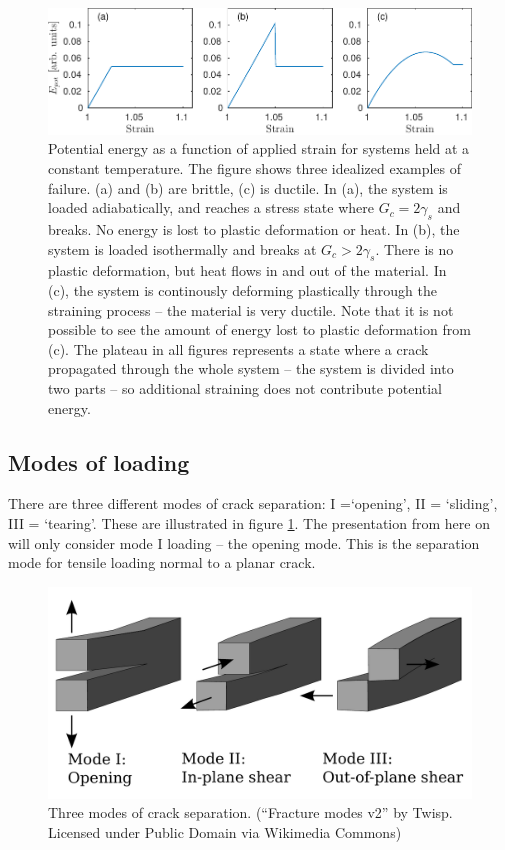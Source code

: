 \begin{figure}
\centering
\includegraphics[width=\textwidth]{../figures/thesis/idealized_fracture_e_pot.pdf}
\caption{Potential energy as a function of applied strain for systems held at a constant temperature. The figure shows three idealized examples of failure. (a) and (b) are brittle, (c) is ductile. In (a), the system is loaded adiabatically, and reaches a stress state where $G_c = 2\gamma_s$ and breaks. No energy is lost to plastic deformation or heat. In (b), the system is loaded isothermally and breaks at $G_c > 2\gamma_s$. There is no plastic deformation, but heat flows in and out of the material. In (c), the system is continously deforming plastically through the straining process -- the material is very ductile. Note that it is not possible to see the amount of energy lost to plastic deformation from (c). The plateau in all figures represents a state where a crack propagated through the whole system -- the system is divided into two parts -- so additional straining does not contribute potential energy. }
\end{figure}

\subsection{Modes of loading}
There are three different modes of crack separation: I =`opening', II = `sliding', III = `tearing'. These are illustrated in figure \ref{fig:loading_modes}. The presentation from here on will only consider mode I loading -- the opening mode. This is the separation mode for tensile loading normal to a planar crack.

\begin{figure}
\includegraphics[width=\textwidth]{../figures/thesis/Fracture_modes_v2.pdf}
\caption{Three modes of crack separation. (``Fracture modes v2'' by Twisp. Licensed under Public Domain via Wikimedia Commons)}
\label{fig:loading_modes}
\end{figure}


